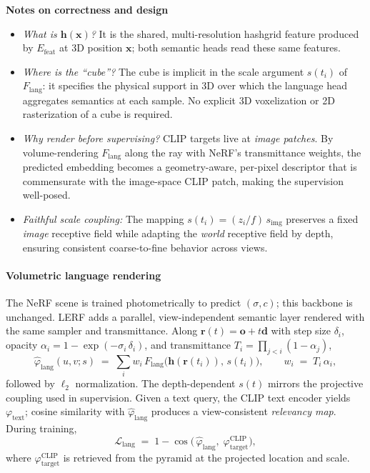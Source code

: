 \begin{enrichment}
\begin{enrichment}
        \textbf{Notes on correctness and design}
        \begin{itemize}
            \item \emph{What is $\mathbf{h}(\mathbf{x})$?} It is the shared, multi-resolution hashgrid feature produced by $E_{\text{feat}}$ at 3D position $\mathbf{x}$; both semantic heads read these same features.
            \item \emph{Where is the “cube”?} The cube is implicit in the scale argument $s(t_i)$ of $F_{\text{lang}}$: it specifies the physical support in 3D over which the language head aggregates semantics at each sample. No explicit 3D voxelization or 2D rasterization of a cube is required.
            \item \emph{Why render before supervising?} CLIP targets live at \emph{image patches}. By volume-rendering $F_{\text{lang}}$ along the ray with NeRF’s transmittance weights, the predicted embedding becomes a geometry-aware, per-pixel descriptor that is commensurate with the image-space CLIP patch, making the supervision well-posed.
            \item \emph{Faithful scale coupling:} The mapping $s(t_i)=(z_i/f)\,s_{\text{img}}$ preserves a fixed \emph{image} receptive field while adapting the \emph{world} receptive field by depth, ensuring consistent coarse-to-fine behavior across views.
        \end{itemize}
        
        \paragraph{Volumetric language rendering}
        The NeRF scene is trained photometrically to predict $(\sigma, c)$; this backbone is unchanged. LERF adds a parallel, view-independent semantic layer rendered with the same sampler and transmittance. Along $\mathbf{r}(t)=\mathbf{o}+t\mathbf{d}$ with step size $\delta_i$, opacity $\alpha_i = 1-\exp(-\sigma_i\,\delta_i)$, and transmittance $T_i = \prod_{j<i}(1-\alpha_j)$,
        \[
        \hat{\varphi}_{\text{lang}}(u,v;s)
        \;=\;
        \sum_{i} w_i \, F_{\text{lang}}\!\big(\mathbf{h}(\mathbf{r}(t_i)),\, s(t_i)\big),
        \qquad
        w_i \;=\; T_i\,\alpha_i,
        \]
        followed by $\ell_2$ normalization. The depth-dependent $s(t)$ mirrors the projective coupling used in supervision. Given a text query, the CLIP text encoder yields $\varphi_{\text{text}}$; cosine similarity with $\hat{\varphi}_{\text{lang}}$ produces a view-consistent \emph{relevancy map}. During training,
        \[
        \mathcal{L}_{\text{lang}}
        \;=\;
        1 - \cos\!\Big(\,\hat{\varphi}_{\text{lang}}, \; \varphi^{\text{CLIP}}_{\text{target}} \Big),
        \]
        where $\varphi^{\text{CLIP}}_{\text{target}}$ is retrieved from the pyramid at the projected location and scale.
        

\end{enrichment}
\end{enrichment}
